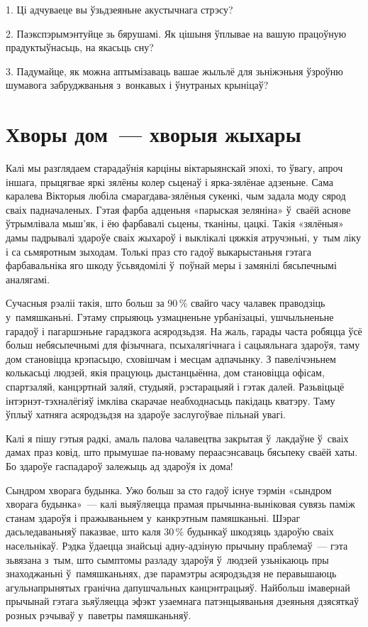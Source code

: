 1. Ці адчуваеце вы ўзьдзеяньне акустычнага стрэсу?

2. Паэкспэрымэнтуйце зь бярушамі. Як цішыня ўплывае на вашую працоўную прадуктыўнасьць, на якасьць сну?

3. Падумайце, як можна аптымізаваць вашае жыльлё для зьніжэньня ўзроўню шумавога забруджваньня з~вонкавых і ўнутраных крыніцаў?


\section{Хворы дом~--- хворыя жыхары}

Калі мы разглядаем старадаўнія карціны віктарыянскай эпохі, то ўвагу, апроч іншага, прыцягвае яркі зялёны колер сьценаў і ярка-зялёнае адзеньне. Сама каралева Вікторыя любіла смарагдава-зялёныя сукенкі, чым задала моду сярод сваіх падначаленых. Гэтая фарба адценьня «парыская зеляніна» ў~сваёй аснове ўтрымлівала мыш'як, і ёю фарбавалі сьцены, тканіны, цацкі. Такія «зялёныя» дамы падрывалі здароўе сваіх жыхароў і выклікалі цяжкія атручэньні, у~тым ліку і са сьмяротным зыходам. Толькі праз сто гадоў выкарыстаньня гэтага фарбавальніка яго шкоду ўсьвядомілі ў~поўнай меры і замянілі бясьпечнымі аналягамі.

Сучасныя рэаліі такія, што больш за 90\,\% свайго часу чалавек праводзіць у~памяшканьні. Гэтаму спрыяюць узмацненьне урбанізацыі, ушчыльненьне гарадоў і пагаршэньне гарадзкога асяродзьдзя. На жаль, гарады часта робяцца ўсё больш небясьпечнымі для фізычнага, псыхалягічнага і сацыяльнага здароўя, таму дом становіцца крэпасьцю, сховішчам і месцам адпачынку. З павелічэньнем колькасьці людзей, якія працуюць дыстанцыённа, дом становіцца офісам, спартзаляй, канцэртнай заляй, студыяй, рэстарацыяй і гэтак далей. Разьвіцьцё інтэрнэт-тэхналёгіяў імкліва скарачае неабходнасьць пакідаць кватэру. Таму ўплыў хатняга асяродзьдзя на здароўе заслугоўвае пільнай увагі.

Калі я пішу гэтыя радкі, амаль палова чалавецтва закрытая ў~лакдаўне ў~сваіх дамах праз ковід, што прымушае па-новаму пераасэнсаваць бясьпеку сваёй хаты. Бо здароўе гаспадароў залежыць ад здароўя іх дома!

Сындром хворага будынка. Ужо больш за сто гадоў існуе тэрмін «сындром хворага будынка»~--- калі выяўляецца прамая прычынна-выніковая сувязь паміж станам здароўя і пражываньнем у~канкрэтным памяшканьні. Шэраг дасьледаваньняў паказвае, што каля 30\,\% будынкаў шкодзяць здароўю сваіх насельнікаў. Рэдка ўдаецца знайсьці адну-адзіную прычыну праблемаў~--- гэта зьвязана з~тым, што сымптомы разладу здароўя ў~людзей узьнікаюць пры знаходжаньні ў~памяшканьнях, дзе парамэтры асяродзьдзя не перавышаюць агульнапрынятых гранічна дапушчальных канцэнтрацыяў. Найбольш імавернай прычынай гэтага зьяўляецца эфэкт узаемнага патэнцыяваньня дзеяньня дзясяткаў розных рэчываў у~паветры памяшканьняў.

